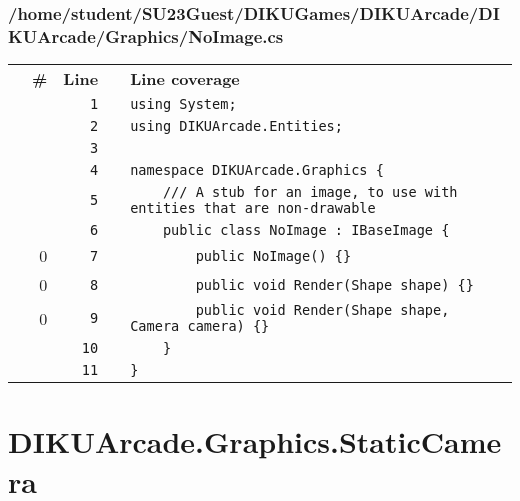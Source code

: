 \documentclass[a4paper,landscape,10pt]{article}
\begin{document}
\subsubsection{/home/student/SU23Guest/DIKUGames/DIKUArcade/DIKUArcade/Graphics/NoImage.cs}
\begin{longtable}[l]{lrrll}
\textbf{} & \textbf{\#} & \textbf{Line} & \textbf{} & \textbf{Line coverage}\\
\cellcolor{gray} &  & \verb~1~ & & \verb~using System;~\\
\cellcolor{gray} &  & \verb~2~ & & \verb~using DIKUArcade.Entities;~\\
\cellcolor{gray} &  & \verb~3~ & & \verb~~\\
\cellcolor{gray} &  & \verb~4~ & & \verb~namespace DIKUArcade.Graphics {~\\
\cellcolor{gray} &  & \verb~5~ & & \verb~    /// A stub for an image, to use with entities that are non-drawable~\\
\cellcolor{gray} &  & \verb~6~ & & \verb~    public class NoImage : IBaseImage {~\\
\cellcolor{red} & 0 & \verb~7~ & & \verb~        public NoImage() {}~\\
\cellcolor{red} & 0 & \verb~8~ & & \verb~        public void Render(Shape shape) {}~\\
\cellcolor{red} & 0 & \verb~9~ & & \verb~        public void Render(Shape shape, Camera camera) {}~\\
\cellcolor{gray} &  & \verb~10~ & & \verb~    }~\\
\cellcolor{gray} &  & \verb~11~ & & \verb~}~\\
\end{longtable}
\newpage
\section{DIKUArcade.Graphics.StaticCamera}
\end{document}
